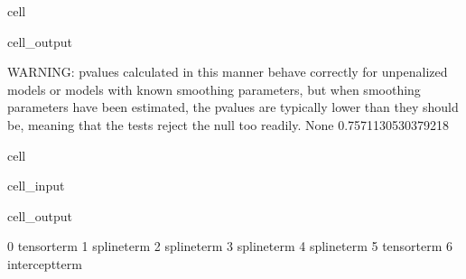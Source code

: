 \documentclass[letterpaper,10pt,english]{jupyterBook}
\begin{document}
\begin{sphinxuseclass}{cell}
\begin{sphinxVerbatimOutput}
\begin{sphinxuseclass}{cell_output}
\begin{sphinxVerbatim}[commandchars=\\\{\}]
WARNING: p\PYGZhy{}values calculated in this manner behave correctly for un\PYGZhy{}penalized models or models with
         known smoothing parameters, but when smoothing parameters have been estimated, the p\PYGZhy{}values
         are typically lower than they should be, meaning that the tests reject the null too readily.
None
0.7571130530379218
\end{sphinxVerbatim}

\end{sphinxuseclass}\end{sphinxVerbatimOutput}

\end{sphinxuseclass}
\begin{sphinxuseclass}{cell}\begin{sphinxVerbatimInput}

\begin{sphinxuseclass}{cell_input}
\begin{sphinxVerbatim}[commandchars=\\\{\}]
    
     
\end{sphinxVerbatim}

\end{sphinxuseclass}\end{sphinxVerbatimInput}
\begin{sphinxVerbatimOutput}

\begin{sphinxuseclass}{cell_output}
\begin{sphinxVerbatim}[commandchars=\\\{\}]
0 tensor\PYGZus{}term
1 spline\PYGZus{}term
2 spline\PYGZus{}term
3 spline\PYGZus{}term
4 spline\PYGZus{}term
5 tensor\PYGZus{}term
6 intercept\PYGZus{}term
\end{sphinxVerbatim}

\end{sphinxuseclass}\end{sphinxVerbatimOutput}

\end{sphinxuseclass}
\end{document}
